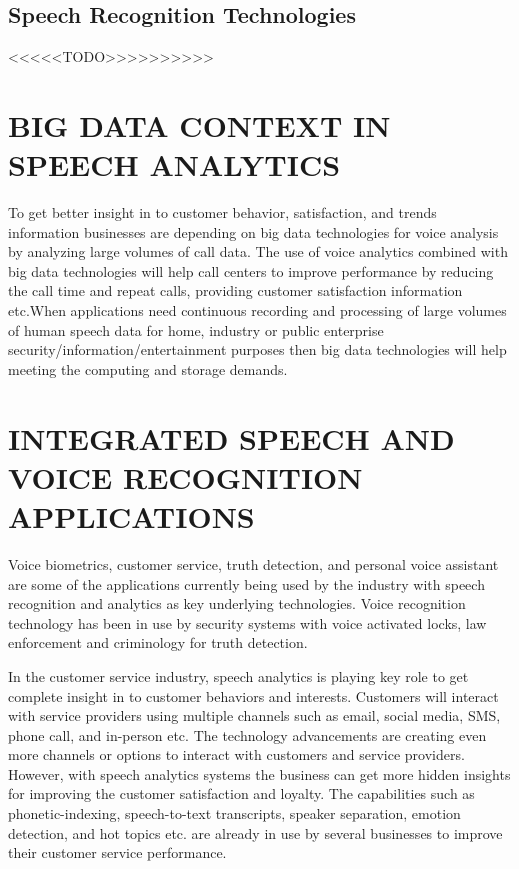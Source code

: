 \documentclass[sigconf]{acmart}
\begin{document}
\subsection{Speech Recognition Technologies}     

<<<<<TODO>>>>>>>>>>


\section{BIG DATA CONTEXT IN SPEECH ANALYTICS}
To get better insight in to customer behavior, satisfaction, and trends information businesses are depending on big data technologies for voice analysis by analyzing large volumes of call data. The use of voice analytics combined with big data technologies will help call centers to improve performance by reducing the call time and repeat calls, providing customer satisfaction information etc.When applications need continuous recording and processing of large volumes of human speech data for home, industry or public enterprise security/information/entertainment purposes then big data technologies will help meeting the computing and storage demands.  

\section{INTEGRATED SPEECH AND VOICE RECOGNITION APPLICATIONS}
Voice biometrics, customer service, truth detection, and personal voice assistant are some of the applications currently being used by the industry with speech recognition and analytics as key underlying technologies. Voice recognition technology has been in use by security systems with voice activated locks, law enforcement and criminology for truth detection. 

In the customer service industry, speech analytics is playing key role to get complete insight in to customer behaviors and interests. Customers will interact with service providers using multiple channels such as email, social media, SMS, phone call, and in-person etc. The technology advancements are creating even more channels or options to interact with customers and service providers.  However, with speech analytics systems the business can get more hidden insights for improving the customer satisfaction and loyalty. The capabilities such as phonetic-indexing, speech-to-text transcripts, speaker separation, emotion detection, and hot topics etc. are already in use by several businesses to improve their customer service performance.
\end{document}

